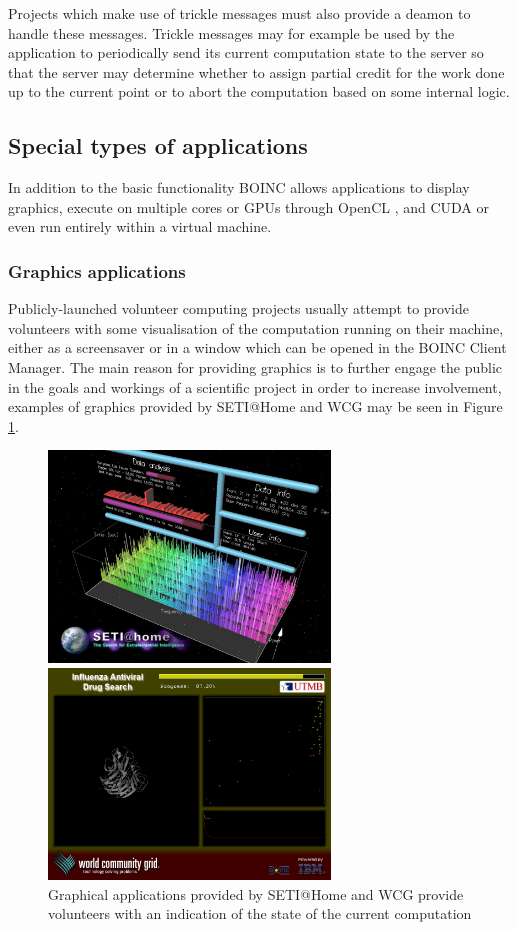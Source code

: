 Projects which make use of trickle messages must also provide a deamon to handle these messages. Trickle messages may for example be used by the application to periodically send its current computation state to the server  so that the server may   determine whether to assign partial credit for the work done up to the current point  or   to abort the computation based on some internal logic.

\subsection{Special types of applications}
In addition to the basic functionality BOINC allows applications to display graphics, execute on multiple cores or GPUs through OpenCL \cite{opencl}, and CUDA \cite{cuda} or even run entirely within a virtual machine. 
\subsubsection{Graphics applications}
Publicly-launched volunteer computing projects usually attempt to provide volunteers with some visualisation of the computation running on their machine, either as a screensaver or in a window which can be opened in the BOINC Client Manager. The main reason for providing graphics is to further engage the public in the goals and workings of a scientific project in order to increase involvement, examples of graphics provided by SETI@Home and WCG may be seen in Figure \ref{fig:boincgraphics}.
\begin{figure}[htb]\label{fig:boincgraphics}
\centering
\begin{minipage}{7.5cm}
\includegraphics[width=7.5cm]{images/graphics1}
 \end{minipage} \hspace{.1cm}
\begin{minipage}{7.5cm}
\includegraphics[width=7.5cm]{images/graphics2}
 \end{minipage}
\caption{Graphical applications provided by SETI@Home and WCG provide volunteers with an indication of the state of the current computation}
\end{figure}
